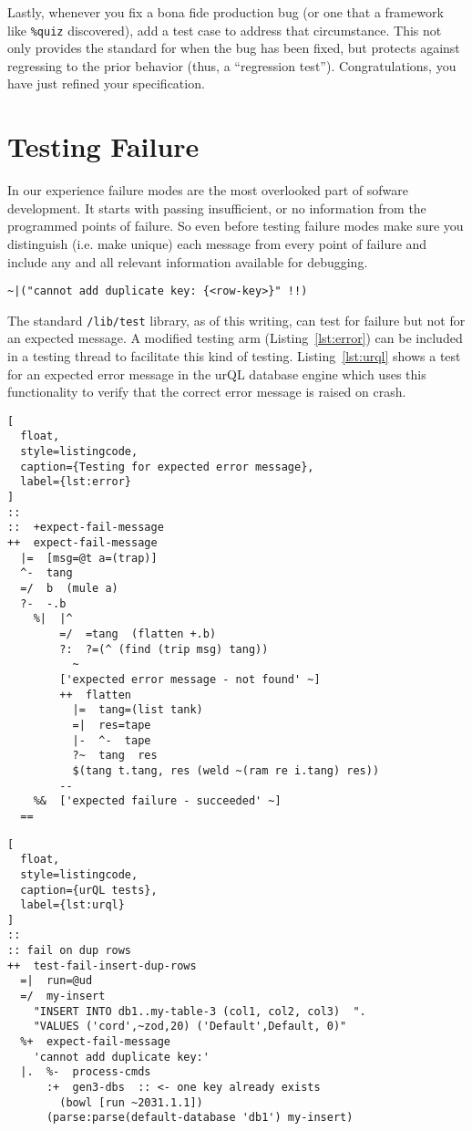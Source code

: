 \documentclass[twoside]{article}
\begin{document}
Lastly, whenever you fix a bona fide production bug (or one that a framework like \texttt{\%quiz} discovered), add a test case to address that circumstance. This not only provides the standard for when the bug has been fixed, but protects against regressing to the prior behavior (thus, a “regression test”). Congratulations, you have just refined your specification.

\section{Testing Failure}

In our experience failure modes are the most overlooked part of sofware development. It starts with passing insufficient, or no information from the programmed points of failure. So even before testing failure modes make sure you distinguish (i.e. make unique) each message from every point of failure and include any and all relevant information available for debugging.

\begin{lstlisting}  
~|("cannot add duplicate key: {<row-key>}" !!)
\end{lstlisting}

The standard \texttt{/lib/test} library, as of this writing, can test for failure but not for an expected message.  A modified testing arm (Listing~\ref{lst:error}) can be included in a testing thread to facilitate this kind of testing.  Listing~\ref{lst:urql} shows a test for an expected error message in the urQL database engine which uses this functionality to verify that the correct error message is raised on crash.

\begin{lstlisting}[
  float,
  style=listingcode,
  caption={Testing for expected error message},
  label={lst:error}
]
::
::  +expect-fail-message
++  expect-fail-message
  |=  [msg=@t a=(trap)]
  ^-  tang
  =/  b  (mule a)
  ?-  -.b
    %|  |^
        =/  =tang  (flatten +.b)
        ?:  ?=(^ (find (trip msg) tang))
          ~
        ['expected error message - not found' ~]
        ++  flatten
          |=  tang=(list tank)
          =|  res=tape
          |-  ^-  tape
          ?~  tang  res
          $(tang t.tang, res (weld ~(ram re i.tang) res))
        --
    %&  ['expected failure - succeeded' ~]
  ==
\end{lstlisting}

\begin{lstlisting}[
  float,
  style=listingcode,
  caption={urQL tests},
  label={lst:urql}
]
::
:: fail on dup rows
++  test-fail-insert-dup-rows
  =|  run=@ud
  =/  my-insert
    "INSERT INTO db1..my-table-3 (col1, col2, col3)  ".
    "VALUES ('cord',~zod,20) ('Default',Default, 0)"
  %+  expect-fail-message
    'cannot add duplicate key:'
  |.  %-  process-cmds
      :+  gen3-dbs  :: <- one key already exists
        (bowl [run ~2031.1.1])
      (parse:parse(default-database 'db1') my-insert)
\end{lstlisting}
\end{document}

